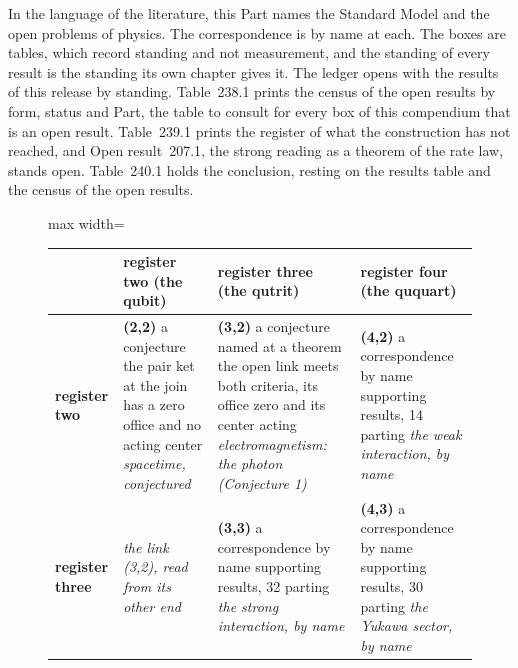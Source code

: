 In the language of the literature, this Part names the Standard Model and the open problems of physics. The correspondence is by name at each. The boxes are tables, which record standing and not measurement, and the standing of every result is the standing its own chapter gives it.
\label{narr:open:14-1}The ledger opens with the results of this release by standing.
\label{narr:open:14-2}Table~238.1 prints the census of the open results by form, status and Part, the table to consult for every box of this compendium that is an open result.
\label{narr:open:14-7}Table~239.1 prints the register of what the construction has not reached, and Open result~207.1, the strong reading as a theorem of the rate law, stands open.
\label{narr:open:14-C}Table~240.1 holds the conclusion, resting on the results table and the census of the open results.
\begin{figure}[htbp]\centering
\footnotesize
\setlength{\tabcolsep}{3pt}
\begin{adjustbox}{max width=\linewidth}\begin{tabular}{|p{14mm}|p{44mm}|p{44mm}|p{44mm}|}
\hline
 & \textbf{register two} (the qubit) & \textbf{register three} (the qutrit) & \textbf{register four} (the ququart) \\ \hline
\textbf{register two} & \textbf{(2,2)} \newline a conjecture \newline the pair ket at the join has a zero office and no acting center \newline \emph{spacetime, conjectured} & \textbf{(3,2)} \newline a conjecture named at a theorem \newline the open link meets both criteria, its office zero and its center acting \newline \emph{electromagnetism: the photon (Conjecture 1)} & \textbf{(4,2)} \newline a correspondence by name \newline 38 supporting results, 14 parting \newline \emph{the weak interaction, by name} \\ \hline
\textbf{register three} & \emph{the link (3,2), read from its other end} & \textbf{(3,3)} \newline a correspondence by name \newline 45 supporting results, 32 parting \newline \emph{the strong interaction, by name} & \textbf{(4,3)} \newline a correspondence by name \newline 16 supporting results, 30 parting \newline \emph{the Yukawa sector, by name} \\ \hline

\end{tabular}
\end{adjustbox}
\end{figure}
